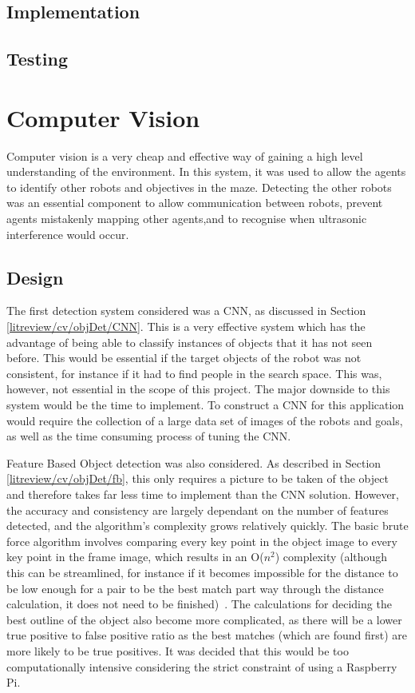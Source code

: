 \subsection{Implementation}\label{soft/SLAM/impl}

\subsection{Testing}\label{soft/SLAM/test}



\section{Computer Vision}\label{soft/cv}
Computer vision is a very cheap and effective way of gaining a high level 
understanding of the environment. In this system, it was used to allow the agents to 
identify other robots and objectives in the maze. Detecting the other 
robots was an essential component to allow communication between robots, 
prevent agents mistakenly mapping other agents,and to recognise when 
ultrasonic interference would occur.

\subsection{Design}\label{soft/cv/design}
The first detection system considered was a CNN, as discussed in Section 
\ref{litreview/cv/objDet/CNN}. This is a very effective system which has 
the advantage of
being able to classify instances of objects that it has not
seen before. This would be essential if the target objects of
the robot was not consistent, for instance if it had to find
people in the search space. This was, however, not essential
in the scope of this project. The major downside to this
system would be the time to implement. To construct a CNN for
this application would require the collection of a large data
set of images of the robots and goals, as well as the time
consuming process of tuning the CNN.

Feature Based Object detection was also considered. As described in 
Section \ref{litreview/cv/objDet/fb}, this only requires a picture to be 
taken of the object and therefore takes far less time to
implement than the CNN solution. However, the accuracy and
consistency are largely dependant on the number of features
detected, and the algorithm's complexity grows relatively
quickly. The basic brute force algorithm involves comparing
every key point in the object image to every key point in the
frame image, which results in an O($n^2$) complexity (although
this can be streamlined, for instance if it becomes impossible
for the distance to be low enough for a pair to be the best
match part way through the distance calculation, it does not
need to be finished)~\cite{opencv_library}. The calculations for deciding the best
outline of the object also become more complicated, as there
will be a lower true positive to false positive ratio as the
best matches (which are found first) are more likely to be
true positives. It was decided that this would be too
computationally intensive considering the strict constraint of
using a Raspberry Pi.


